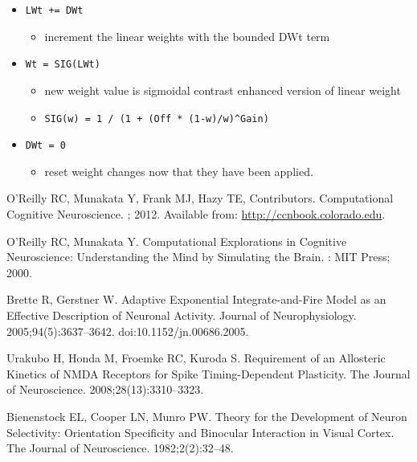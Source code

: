 \documentclass[10pt,letterpaper]{article}
\begin{document}
\begin{itemize}
  \item \texttt{LWt\ +=\ DWt}

    \begin{itemize}
	
    \item
      increment the linear weights with the bounded DWt term
    \end{itemize}
	
  \item\texttt{Wt\ =\ SIG(LWt)}

    \begin{itemize}
	
    \item
      new weight value is sigmoidal contrast enhanced version of linear
      weight
    \item
      \texttt{SIG(w)\ =\ 1\ /\ (1\ +\ (Off\ *\ (1-w)/w)\^{}Gain)}
    \end{itemize}
	
  \item \texttt{DWt\ =\ 0}

    \begin{itemize}
	
    \item
      reset weight changes now that they have been applied.
    \end{itemize}
\end{itemize}



\begin{thebibliography}{10}

  O'Reilly RC, Munakata Y, Frank MJ, Hazy TE, {Contributors}.
  \newblock Computational {{Cognitive Neuroscience}}.
  ; 2012.
  \newblock Available from: \url{http://ccnbook.colorado.edu}.
  
  O'Reilly RC, Munakata Y.
  \newblock Computational {{Explorations}} in {{Cognitive Neuroscience}}:
    {{Understanding}} the {{Mind}} by {{Simulating}} the {{Brain}}.
  : {MIT Press}; 2000.
  
  Brette R, Gerstner W.
  \newblock Adaptive Exponential Integrate-and-Fire Model as an Effective
    Description of Neuronal Activity.
  \newblock Journal of Neurophysiology. 2005;94(5):3637--3642.
  \newblock doi:{10.1152/jn.00686.2005}.
  
  Urakubo H, Honda M, Froemke RC, Kuroda S.
  \newblock Requirement of an Allosteric Kinetics of {{NMDA}} Receptors for Spike
    Timing-Dependent Plasticity.
  \newblock The Journal of Neuroscience. 2008;28(13):3310--3323.
  
  Bienenstock EL, Cooper LN, Munro PW.
  \newblock Theory for the Development of Neuron Selectivity: {{Orientation}}
    Specificity and Binocular Interaction in Visual Cortex.
  \newblock The Journal of Neuroscience. 1982;2(2):32--48.
  
  \end{thebibliography}
  
\end{document}
